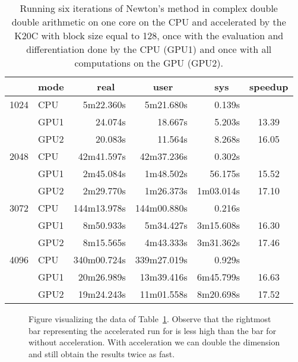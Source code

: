 \documentclass{article}
\begin{document}
\begin{table}[hbt]
\begin{center}
\caption{Running six iterations of Newton's method in complex double double
  arithmetic on one core on the CPU and 
  accelerated by the K20C with block size equal to 128,
  once with the evaluation and differentiation done by the CPU (GPU1)
  and once with all computations on the GPU (GPU2).}
\label{tabnewdd}
\begin{tabular}{cl|rrr|c}
 & mode  &      real~~  &    user ~~  &      sys~~ & speedup \\ \hline
1024 & CPU  &    5m22.360s &   5m21.680s &     0.139s & \\
     & GPU1 &      24.074s &     18.667s &     5.203s & 13.39 \\
     & GPU2 &      20.083s &     11.564s &     8.268s & 16.05 \\ \hline
2048 & CPU  &   42m41.597s &  42m37.236s &     0.302s & \\
     & GPU1 &    2m45.084s &   1m48.502s &    56.175s & 15.52 \\
     & GPU2 &    2m29.770s &   1m26.373s &  1m03.014s & 17.10 \\ \hline
3072 & CPU  &  144m13.978s & 144m00.880s &     0.216s & \\
     & GPU1 &    8m50.933s &   5m34.427s &  3m15.608s & 16.30 \\
     & GPU2 &    8m15.565s &   4m43.333s &  3m31.362s & 17.46 \\ \hline
4096 & CPU  &  340m00.724s & 339m27.019s &     0.929s & \\
     & GPU1 &   20m26.989s &  13m39.416s &  6m45.799s & 16.63 \\
     & GPU2 &   19m24.243s &  11m01.558s &  8m20.698s & 17.52
\end{tabular}
\end{center}
\end{table}

\begin{figure}[hbt]
\begin{center}
\caption{Figure visualizing the data of Table~\ref{tabnewdd}.
Observe that the rightmost bar representing the accelerated run for 
is less high than the bar for  without acceleration.
With acceleration we can double the dimension and still obtain
the results twice as fast.}
\label{fignewdd}
\end{center}
\end{figure}
\end{document}
